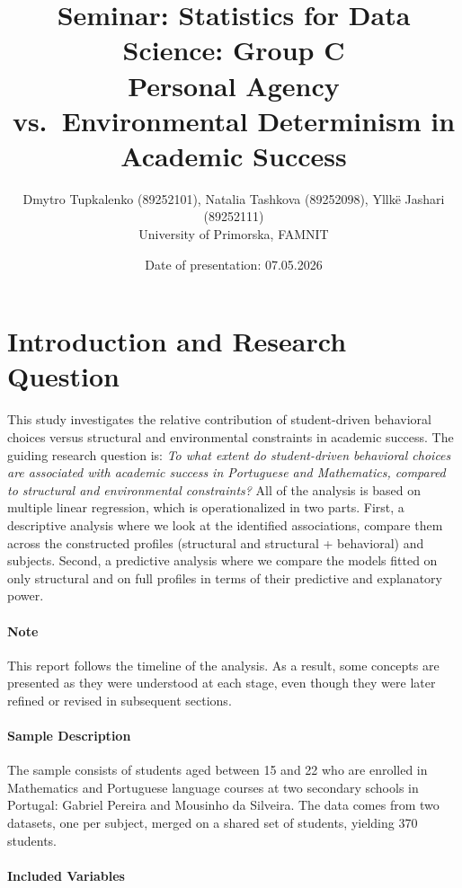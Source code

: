 \documentclass{article}
\title{Seminar: Statistics for Data Science: Group C \\ Personal Agency vs.\ Environmental Determinism in Academic Success}
\author{Dmytro Tupkalenko (89252101), Natalia Tashkova (89252098), Yllk\"{e} Jashari (89252111) \\ University of Primorska, FAMNIT}
\date{Date of presentation: 07.05.2026}
\begin{document}
\maketitle




\newpage
\section{Introduction and Research Question}
\label{sec:introduction}

This study investigates the relative contribution of student-driven behavioral choices versus structural and environmental constraints in academic success. The guiding research question is: \textit{To what extent do student-driven behavioral choices are associated with academic success in Portuguese and Mathematics, compared to structural and environmental constraints?} All of the analysis is based on multiple linear regression, which is operationalized in two parts. First, a descriptive analysis where we look at the identified associations, compare them across the constructed profiles (structural and structural + behavioral) and subjects. Second, a predictive analysis where we compare the models fitted on only structural and on full profiles in terms of their predictive and explanatory power. 


\paragraph{Note}

This report follows the timeline of the analysis. As a result, some concepts are presented as they were understood at each stage, even though they were later refined or revised in subsequent sections.


\paragraph{Sample Description}

The sample consists of students aged between 15 and 22 who are enrolled in Mathematics and Portuguese language courses at two secondary schools in Portugal: Gabriel Pereira and Mousinho da Silveira. The data comes from two datasets, one per subject, merged on a shared set of students, yielding 370 students.


\paragraph{Included Variables}
\end{document}
